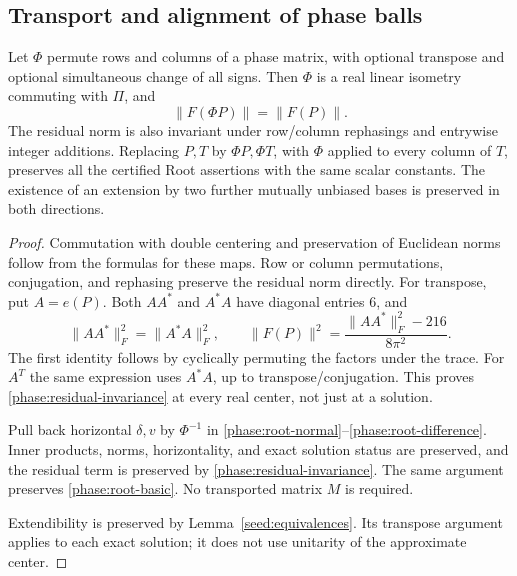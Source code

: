 \subsection{Transport and alignment of phase balls}

\begin{lemma}
\label{phase:transport}
Let \(\Phi\) permute rows and columns of a phase matrix, with optional
transpose and optional simultaneous change of all signs.  Then \(\Phi\)
is a real linear isometry commuting with \(\Pi\), and
\begin{equation}
 \|F(\Phi P)\|=\|F(P)\|.
 \label{phase:residual-invariance}
\end{equation}
The residual norm is also invariant under row/column rephasings and
entrywise integer additions.  Replacing \(P,T\) by \(\Phi P,\Phi T\),
with \(\Phi\) applied to every column of \(T\), preserves all the
certified Root assertions with the same scalar constants.  The
existence of an extension by two further mutually unbiased bases is
preserved in both directions.
\end{lemma}

\begin{proof}
Commutation with double centering and preservation of Euclidean norms
follow from the formulas for these maps.  Row or column permutations,
conjugation, and rephasing preserve the residual norm directly.  For
transpose, put \(A=e(P)\).  Both \(AA^*\) and \(A^*A\) have diagonal
entries \(6\), and
\[
 \|AA^*\|_F^2=\|A^*A\|_F^2,\qquad
 \|F(P)\|^2=\frac{\|AA^*\|_F^2-216}{8\pi^2}.
\]
The first identity follows by cyclically permuting the factors under
the trace.  For \(A^T\) the same expression uses \(A^*A\), up to
transpose/conjugation.  This proves
\eqref{phase:residual-invariance} at every real center, not just at a
solution.

Pull back horizontal \(\delta,v\) by \(\Phi^{-1}\) in
\eqref{phase:root-normal}--\eqref{phase:root-difference}.  Inner products,
norms, horizontality, and exact solution status are preserved, and the
residual term is preserved by \eqref{phase:residual-invariance}.
The same argument preserves \eqref{phase:root-basic}.  No transported
matrix \(M\) is required.

Extendibility is preserved by Lemma~\ref{seed:equivalences}.
Its transpose argument applies to each exact solution; it does not
use unitarity of the approximate center.
\end{proof}


